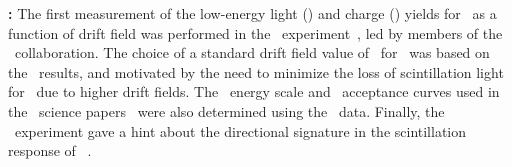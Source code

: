 \begin{compactitem}

\item {\bf \SCENE:} The first measurement of the low-energy light (\SCENERecoilsLightEnergyRange) and charge (\SCENERecoilsIonizationEnergyRange) yields for \NRs\ as a function of drift field was performed in the \SCENE\ experiment~\cite{Alexander:2013ke,Cao:2015ks}, led by members of the \DSf\ collaboration. The choice of a standard drift field value of \DSfDriftField\ for \DSfs\ was based on the \SCENE\ results, and motivated by the need to minimize the loss of scintillation light for \NRs\ due to higher drift fields. The \NR\ energy scale and \NR\ acceptance curves used in the \DSfs\ science papers~\cite{Agnes:2015gu,Agnes:2016fz} were also determined using the \SCENE\ data. Finally, the \SCENE\ experiment gave a hint about the directional signature in the scintillation response of \SCENERecoilsEnergyMax\ \NRs.




\end{compactitem}
